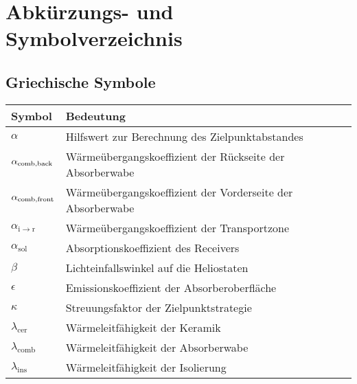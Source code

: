 \chapter*{Abkürzungs- und Symbolverzeichnis}
\renewcommand{\arraystretch}{1.5}
%

\vspace*{-1cm}
\section*{Griechische Symbole}
\begin{table}[ht!]
    \centering
    \begin{tabular}{m{}m{}}
        \rowcolor{white}
        Symbol                                  & Bedeutung                                                     \\
        \midrule
        $\alpha$                                & Hilfswert zur Berechnung des Zielpunktabstandes               \\
        $\alpha_{\mathrm{comb},\mathrm{back}}$  & Wärmeübergangskoeffizient der Rückseite der Absorberwabe      \\
        $\alpha_{\mathrm{comb},\mathrm{front}}$ & Wärmeübergangskoeffizient der Vorderseite der Absorberwabe    \\
        $\alpha_{\mathrm{i\to r}}$              & Wärmeübergangskoeffizient der Transportzone                   \\
        $\alpha_{\mathrm{sol}}$                 & Absorptionskoeffizient des Receivers                          \\
        $\beta$                                 & Lichteinfallswinkel auf die Heliostaten                       \\
        $\epsilon$                              & Emissionskoeffizient der Absorberoberfläche                   \\
        $\kappa$                                & Streuungsfaktor der Zielpunktstrategie                        \\
        $\lambda_{\mathrm{cer}}$                & Wärmeleitfähigkeit der Keramik                                \\
        $\lambda_{\mathrm{comb}}$               & Wärmeleitfähigkeit der Absorberwabe                           \\
        $\lambda_{\mathrm{ins}}$                & Wärmeleitfähigkeit der Isolierung                             \\

\end{tabular}
\end{table}
